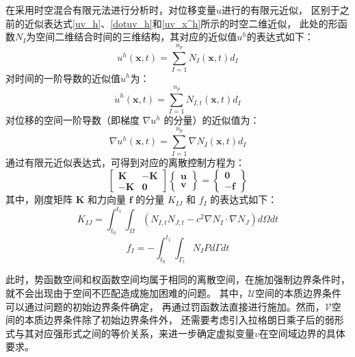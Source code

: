 在采用时空混合有限元法进行分析时，对位移变量$u$进行的有限元近似，
区别于之前的近似表达式\eqref{uv_h}、\eqref{dotuv_h}和\eqref{uv_x^h}所示的时空二维近似，
此处的形函数$N_I$为空间二维结合时间的三维结构，其对应的近似值$u^h$的表达式如下：
\begin{equation}\label{uv^h3d}
u^h (\boldsymbol x,t) = \sum_{I=1}^{n_p} N_I (\boldsymbol x,t) d_I
\end{equation}
对时间的一阶导数的近似值$\dot u^h$为：
\begin{equation}\label{dotuv_h3d}
    \dot u^h (\boldsymbol x,t) = \sum_{I=1}^{n_p} N_{I,t} (\boldsymbol x,t) d_I
\end{equation}
对位移的空间一阶导数（即梯度 $\nabla u^h$ 的分量）的近似值为：
\begin{equation}\label{uv_x^h3d}
    \nabla u^h (\boldsymbol x,t) = \sum_{I=1}^{n_p} \nabla N_{I} (\boldsymbol x,t) d_I
\end{equation}
通过有限元近似表达式，可得到对应的离散控制方程为：
\begin{equation}
\begin{bmatrix}
\boldsymbol K & -\boldsymbol K \\ -\boldsymbol K & \boldsymbol 0
\end{bmatrix}
\begin{Bmatrix}
\boldsymbol u \\ \boldsymbol v
\end{Bmatrix} =
\begin{Bmatrix}
 \boldsymbol 0 \\ -\boldsymbol f
\end{Bmatrix}
\end{equation}
其中，刚度矩阵 $\boldsymbol K$ 和力向量 $\boldsymbol f$ 的分量 $K_{IJ}$ 和 $f_I$ 的表达式如下：
\begin{equation}
    K_{IJ} = \int_{t_0}^{t_1} \int_{\Omega} \left( N_{I,t} N_{J,t} - c^2 \nabla N_I \cdot \nabla N_J \right) d\Omega dt
\end{equation}
\begin{equation}
    f_I = - \int_{t_0}^{t_1} \int_{\Gamma_t} N_I P d\Gamma dt
\end{equation}

此时，势函数空间和权函数空间均属于相同的离散空间，在施加强制边界条件时，
就不会出现由于空间不匹配造成施加困难的问题。
其中，$\mathcal U$空间的本质边界条件可以通过问题的初始边界条件确定，
再通过罚函数法直接进行施加。然而，$\mathcal V$空间的本质边界条件除了初始边界条件外，
还需要考虑引入拉格朗日乘子后的弱形式与其对应强形式之间的等价关系，来进一步确定虚拟变量$v$在空间域边界的具体要求。

